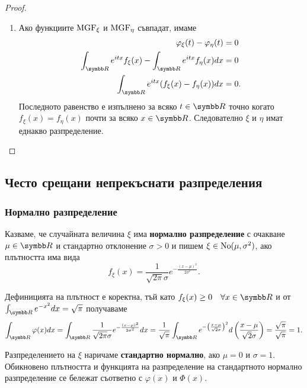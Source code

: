 \documentclass[
  headings=standardclasses,
  bibliography=totocnumbered,
]{scrartcl}
\begin{document}
\begin{proof}
\begin{enumerate}
    \item Ако функциите \( \operatorname{MGF}_\xi \) и \( \operatorname{MGF}_\eta \) съвпадат, имаме
    \begin{align*}
      \Char_\xi(t) - \Char_\eta(t) &= 0
      \\
      \int_{\R} e^{itx} f_\xi(x) - \int_{\R} e^{itx} f_\eta(x) dx &= 0
      \\
      \int_{\R} e^{itx} (f_\xi(x) - f_\eta(x)) dx &= 0.
    \end{align*}
    Последното равенство е изпълнено за всяко \( t \in \R \) точно когато \( f_\xi(x) = f_\eta(x) \) почти за всяко \( x \in \R \). Следователно \( \xi \) и \( \eta \) имат еднакво разпределение.
  \end{enumerate}
\end{proof}

\subsection{Често срещани непрекъснати разпределения}

\subsubsection{Нормално разпределение}\label{sec:normal}

\begin{definition}
  Казваме, че случайната величина \( \xi \) има \textbf{нормално разпределение} с очакване \( \mu \in \R \) и стандартно отклонение \( \sigma > 0 \) и пишем \( \xi \in \operatorname{No}(\mu, \sigma^2) \), ако плътността има вида
  \begin{equation*}
    f_\xi(x) = \frac 1 {\sqrt{2\pi} \sigma} e^{-\frac{{(x-\mu)}^2} {2\sigma^2}}.
  \end{equation*}

  Дефиницията на плътност е коректна, тъй като \( f_\xi(x) \geq 0\quad\forall x \in \R \) и от \( \int_{\R} e^{-x^2} dx = \sqrt \pi \) получаваме
  \begin{equation*}
    \int_{\R} \varphi(x) dx
    =
    \int_{\R} \frac 1 {\sqrt{2\pi} \sigma} e^{-\frac{{(x-\mu)}^2} {2\sigma^2}} dx
    =
    \frac 1 {\sqrt{\pi}} \int_{\R} e^{-{\left(\frac {x-\mu} {\sqrt 2 \sigma} \right)}^2} d\left(\frac {x-\mu} {\sqrt 2 \sigma} \right)
    =
    \frac {\sqrt{\pi}} {\sqrt{\pi}}
    =
    1.
  \end{equation*}

  Разпределението на \( \xi \) наричаме \textbf{стандартно нормално}, ако \( \mu = 0 \) и \( \sigma = 1 \). Обикновено плътността и функцията на разпределение на стандартното нормално разпределение се бележат съответно с \( \varphi(x) \) и \( \Phi(x) \).
\end{definition}
\end{document}
